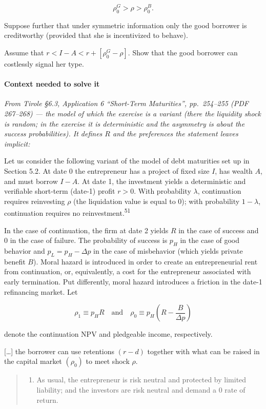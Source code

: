 \documentclass[11pt,a4paper]{article}
\providecommand{\tightlist}{\setlength{\itemsep}{0pt}\setlength{\parskip}{0pt}}
\begin{document}
\[\rho_0^G > \rho > \rho_0^B.\]

Suppose further that under symmetric information only the good borrower is creditworthy (provided
that she is incentivized to behave).

Assume that \(r < I - A < r + [\rho_0^G - \rho]\). Show that the good borrower can costlessly signal
her type.

\paragraph{Context needed to solve it}

\emph{From Tirole §6.3, Application 6 ``Short-Term Maturities'', pp.~254--255 (PDF 267--268) --- the
model of which the exercise is a variant (there the liquidity shock is random; in the exercise it is
deterministic and the asymmetry is about the success probabilities). It defines \(R\) and the
preferences the statement leaves implicit:}

Let us consider the following variant of the model of debt maturities set up in Section 5.2. At date
0 the entrepreneur has a project of fixed size \(I\), has wealth \(A\), and must borrow \(I - A\).
At date 1, the investment yields a deterministic and verifiable short-term (date-1) profit
\(r > 0\). With probability \(\lambda\), continuation requires reinvesting \(\rho\) (the liquidation
value is equal to 0); with probability \(1 - \lambda\), continuation requires no
reinvestment.\textsuperscript{51}

In the case of continuation, the firm at date 2 yields \(R\) in the case of success and 0 in the
case of failure. The probability of success is \(p_H\) in the case of good behavior and
\(p_L = p_H - \Delta p\) in the case of misbehavior (which yields private benefit \(B\)). Moral
hazard is introduced in order to create an entrepreneurial rent from continuation, or, equivalently,
a cost for the entrepreneur associated with early termination. Put differently, moral hazard
introduces a friction in the date-1 refinancing market. Let

\[\rho_1 \equiv p_H R \quad \text{and} \quad \rho_0 \equiv p_H\left(R - \frac{B}{\Delta p}\right)\]

denote the continuation NPV and pledgeable income, respectively.

{[}\ldots{]} the borrower can use retentions \((r - d)\) together with what can be raised in the
capital market \((\rho_0)\) to meet shock \(\rho\).

\begin{quote}
\begin{enumerate}
\def\labelenumi{\arabic{enumi}.}
\setcounter{enumi}{50}
\tightlist
\item
  As usual, the entrepreneur is risk neutral and protected by limited liability; and the investors
  are risk neutral and demand a 0 rate of return.
\end{enumerate}
\end{quote}
\end{document}
